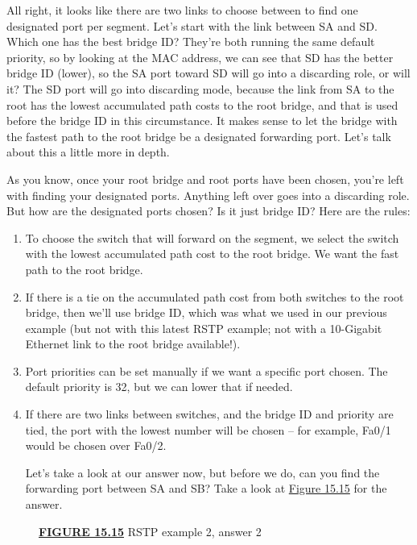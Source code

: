 All right, it looks like there are two links to choose between to find
one designated port per segment. Let's start with the link between SA
and SD. Which one has the best bridge
ID? They're both
running the same default priority, so by looking at the MAC address, we
can see that SD has the better bridge ID (lower), so the SA port toward
SD will go into a discarding role, or will it? The SD port will go into
discarding mode, because the link from SA to the root has the lowest
accumulated path costs to the root bridge, and that is used before the
bridge ID in this circumstance. It makes sense to let the bridge with
the fastest path to the root bridge be a designated forwarding port.
Let's talk about this a little more in depth.

As you know, once your root bridge and root ports have been chosen,
you're left with finding your designated ports. Anything left over goes
into a discarding role. But how are the designated ports chosen? Is it
just bridge ID? Here are the rules:

\begin{enumerate}
\item
  To choose the switch that will forward on the segment, we select the
  switch with the lowest accumulated path cost to the root bridge. We
  want the fast path to the root bridge.
\item
  If there is a tie on the accumulated path cost from both switches to
  the root bridge, then we'll use bridge ID, which was what we used in
  our previous example (but not with this latest RSTP example; not with
  a 10-Gigabit Ethernet link to the root bridge available!).
\item
  Port priorities can be set manually if we want a specific port chosen.
  The default priority is 32, but we can lower that if needed.
\item
  If there are two links between switches, and the bridge ID and
  priority are tied, the port with the lowest number will be
  chosen -- for example, Fa0/1 would be chosen over Fa0/2.

  Let's take a look at our answer now, but before we do, can you find
  the forwarding port between SA and SB? Take a look at
  \protect\hyperlink{c15.xhtmlux5cux23figure15-15}{Figure 15.15} for the
  answer.
\end{enumerate}

\begin{figure}
\centering
\caption{{\protect\hyperlink{c15.xhtmlux5cux23figureanchor15-15}{\textbf{FIGURE
15.15}} RSTP example 2, answer 2}}
\end{figure}

